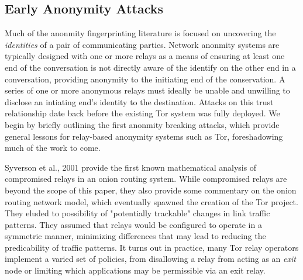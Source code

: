 \documentclass[sigconf]{acmart}
\begin{document}
\subsection{Early Anonymity Attacks}\label{subsec:early_anonymity_attacks}

Much of the anonmity fingerprinting literature is focused on uncovering
the \emph{identities} of a pair of communicating parties.  Network
anonmity systems are typically designed with one or more relays as a
means of ensuring at least one end of the conversation is not directly
aware of the identify on the other end in a conversation, providing
anonymity to the initiating end of the conservation.  A series of one or
more anonymous relays must ideally be unable and unwilling to disclose
an intiating end's identity to the destination.  Attacks on this trust
relationship date back before the existing Tor system was fully
deployed.  We begin by briefly outlining the first anonmity breaking
attacks, which provide general lessons for relay-based anonymity systems
such as Tor, foreshadowing much of the work to come.

Syverson et al., 2001 \cite{syverson_towards_2001} provide the first
known mathematical analysis of compromised relays in an onion routing
system.  While compromised relays are beyond the scope of this paper,
they also provide some commentary on the onion routing network model,
which eventually spawned the creation of the Tor project.  They eluded
to possibility of "potentially trackable" changes in link traffic
patterns.  They assumed that relays would be configured to operate in a
symmetric manner, minimizing differences that may lead to reducing the
predicability of traffic patterns.  It turns out in practice, many Tor
relay operators implement a varied set of policies, from disallowing a
relay from acting as an \emph{exit} node or limiting which applications
may be permissible via an exit relay.
\end{document}
